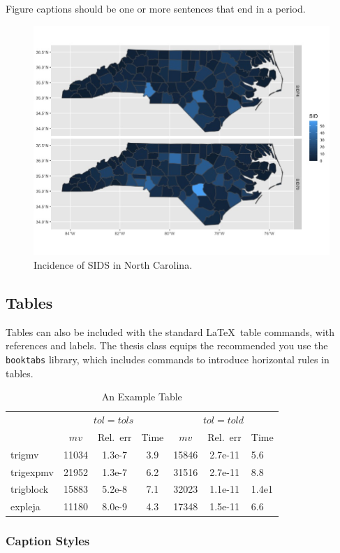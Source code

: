 Figure captions should be one or more sentences that end in a period.

\begin{figure}
  \includegraphics[width=\textwidth]{./images/ncplot}
  \caption{\label{fig:ncplot} Incidence of SIDS in North Carolina.}
\end{figure}

\lipsum[2]

\subsection{Tables}

Tables can also be included with the standard \LaTeX \ table commands, with
references and labels. The thesis class equips the recommended you use the
\texttt{booktabs} library, which includes commands to introduce horizontal
rules in tables.

\begin{table}
  \begin{center}
\caption{\label{tab:example} An Example Table}
\begin{tabular}{lcccccl}
  \toprule
& \multicolumn{3}{c}{$tol=tols$} & \multicolumn{3}{c}{$tol=told$}
\\\cmidrule(lr){2-4}
\cmidrule(lr){5-7}
           & $mv$  & Rel.~err & Time    & $mv$  & Rel.~err & Time\\
\midrule
trigmv    & 11034 & 1.3e-7 & 3.9 & 15846 & 2.7e-11 & 5.6 \\
trigexpmv & 21952 & 1.3e-7 & 6.2 & 31516 & 2.7e-11 & 8.8 \\
trigblock & 15883 & 5.2e-8 & 7.1 & 32023 & 1.1e-11 & 1.4e1\\
expleja   & 11180 & 8.0e-9 & 4.3 & 17348 & 1.5e-11 & 6.6 \\
\bottomrule
\end{tabular}
\end{center}
\end{table}

\subsubsection{Caption Styles}
\lipsum
